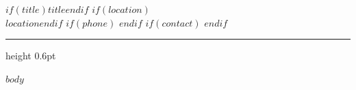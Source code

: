 \documentclass[$if(fontsize)$$fontsize$$else$9pt$endif$]{extarticle}
\begin{document}
\begin{center}
  {\fontsize{16}{19}\selectfont\lightfont $if(title)$$title$$endif$}%
  $if(location)$\\[0.15em]{\small $location$}$endif$%
  $if(phone)$ \enspace{\small\color{black60}\textperiodcentered}$endif$%
  $if(contact)$ \enspace{\small\color{black60}\textperiodcentered}$endif$
\end{center}

\vspace{0.1em}
{\color{sapphire}\hrule height 0.6pt}
\vspace{0.2em}

$body$
\end{document}
